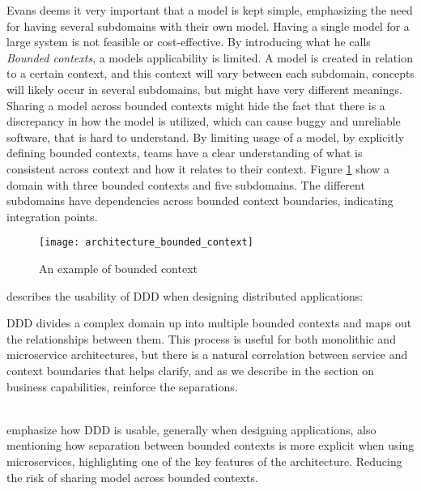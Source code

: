Evans deems it very important that a model is kept simple, emphasizing the need for having several subdomains with their own model. Having a single model for a large system is not feasible or cost-effective\cite[p.~331]{evans2004domain}. By introducing what he calls \textit{Bounded contexts}, a models applicability is limited. A model is created in relation to a certain context, and this context will vary between each subdomain, concepts will likely occur in several subdomains, but might have very different meanings. Sharing a model across bounded contexts might hide the fact that there is a discrepancy in how the model is utilized, which can cause buggy and unreliable software, that is hard to understand. By limiting usage of a model, by explicitly defining bounded contexts, teams have a clear understanding of what is consistent across context and how it relates to their context\cite[p.~331]{evans2004domain}. Figure \ref{fig:architecture_bounded_context} show a domain with three bounded contexts and five subdomains. The different subdomains have dependencies across bounded context boundaries, indicating integration points.

\begin{figure}[!htb]
  \texttt{[image: architecture\_bounded\_context]}  
  \caption{An example of bounded context}
  \label{fig:architecture_bounded_context}
\end{figure}


\citeauthor{fowler2014microservices} describes the usability of DDD when designing distributed applications:

\begin{quote_highlight}
DDD divides a complex domain up into multiple bounded contexts and maps out the relationships between them. This process is useful for both monolithic and microservice architectures, but there is a natural correlation between service and context boundaries that helps clarify, and as we describe in the section on business capabilities, reinforce the separations\cite{fowler2014microservices}.
\end{quote_highlight}\\

\citeauthor{fowler2014microservices} emphasize how DDD is usable, generally when designing applications, also mentioning how separation between bounded contexts is more explicit when using microservices, highlighting one of the key features of the architecture. Reducing the risk of sharing model across bounded contexts.

